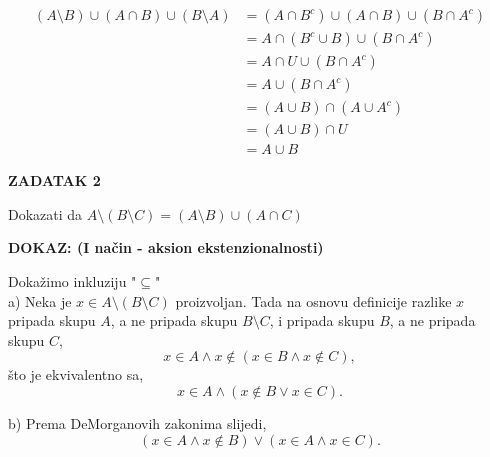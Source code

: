 \documentclass{article}
\begin{document}
        \begin{align*}
            (A\setminus B)\cup (A\cap B)\cup (B\setminus A) &= (A\cap B^c)\cup (A\cap B)\cup (B\cap A^c)\tag{jer je $X\setminus Y=X\cap Y^c$} \\
                                                            &= A\cap (B^c\cup B)\cup (B\cap A^c)\tag{$(p\land \lnot q)\vee (p\land q)\Leftrightarrow  p\land (\lnot q\vee q)$}\\
                                                            &= A\cap U\cup (B\cap A^c)\tag{jer je $X^c\cup X=U\ [univerzum]$}\\
                                                            &= A\cup (B\cap A^c)\tag{jer je $X\cap U=X$}\\
                                                            &= (A\cup B)\cap (A\cup A^c)\tag{$p\vee (q\land \lnot p)\Leftrightarrow (p\vee q)\land (p\vee \lnot p)$}\\
                                                            &= (A\cup B)\cap U\tag{$X^c\cup X=U$}\\
                                                            &= A\cup B\tag{$X\cap U=X$}
        \end{align*}

        \newpage\noindent\thispagestyle{empty}
        \begin{flushleft}

            \textbf{ZADATAK 2}\\
            \bigskip
    
            Dokazati da
            $A\setminus (B\setminus C)=(A\setminus B)\cup (A\cap C)$\\
            \bigskip
    
            \textbf{DOKAZ: (I način - aksion ekstenzionalnosti)}
        \end{flushleft}

        \noindent
        Dokažimo inkluziju "$\subseteq $"\\
        a) Neka je $x\in A\setminus (B\setminus C)$ proizvoljan. Tada na osnovu definicije razlike $x$ pripada skupu $A$, a ne pripada skupu $B\setminus C$, i pripada skupu $B$, a ne pripada skupu $C$,
        $$x\in A\land x\notin (x\in B\land x\notin C),$$
        što je ekvivalentno sa,
        $$x\in A\land (x\notin B\vee x\in C).$$
        \smallskip

        \noindent
        b) Prema DeMorganovih zakonima slijedi,
        $$(x\in A\land x\notin B)\vee (x\in A\land x\in C).$$
        \smallskip
\end{document}

